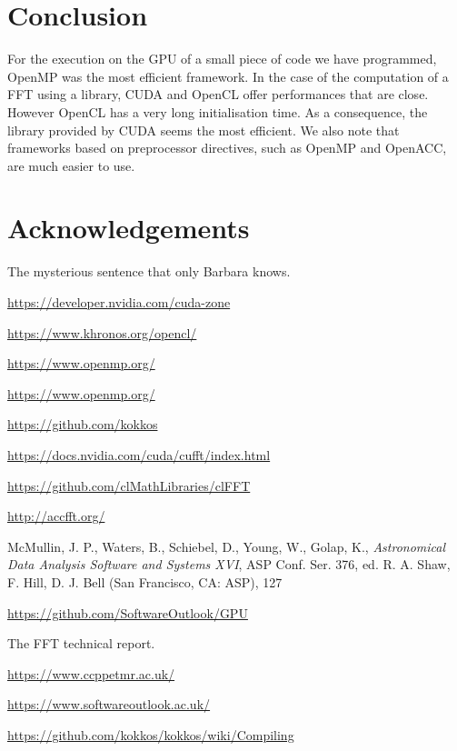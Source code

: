 \documentclass[12pt, a4paper]{article}
\begin{document}
\section{Conclusion}
For the execution on the GPU of a small piece of code we have programmed, OpenMP was the most efficient framework. In the case of the computation of a FFT using a library, CUDA and OpenCL offer performances that are close. However OpenCL has a very long initialisation time. As a consequence, the library provided by CUDA seems the most efficient. We also note that frameworks based on preprocessor directives, such as OpenMP and OpenACC, are much easier to use. 

\section{Acknowledgements}
The mysterious sentence that only Barbara knows.

\begin{thebibliography}{9}

\hyperlink{https://developer.nvidia.com/cuda-zone}{https://developer.nvidia.com/cuda-zone}

\hyperlink{https://www.khronos.org/opencl/}{https://www.khronos.org/opencl/}

\hyperlink{https://www.openmp.org/}{https://www.openmp.org/}
  
\hyperlink{https://www.openmp.org/}{https://www.openmp.org/}

\hyperlink{https://github.com/kokkos}{https://github.com/kokkos}

\hyperlink{https://docs.nvidia.com/cuda/cufft/index.html}{https://docs.nvidia.com/cuda/cufft/index.html}

  \hyperlink{https://github.com/clMathLibraries/clFFT}{https://github.com/clMathLibraries/clFFT}
  
\hyperlink{http://accfft.org/}{http://accfft.org/}

McMullin, J. P., Waters, B., Schiebel, D., Young, W., Golap, K.,
{\it Astronomical Data Analysis Software and Systems XVI},
ASP Conf. Ser. 376, ed. R. A. Shaw, F. Hill, D. J. Bell (San Francisco, CA: ASP), 127

\hyperlink{https://github.com/SoftwareOutlook/GPU}{https://github.com/SoftwareOutlook/GPU}

The FFT technical report.

\hyperlink{https://www.ccppetmr.ac.uk/}{https://www.ccppetmr.ac.uk/}

\hyperlink{https://www.softwareoutlook.ac.uk/}{https://www.softwareoutlook.ac.uk/}

\hyperlink{https://github.com/kokkos/kokkos/wiki/Compiling}{https://github.com/kokkos/kokkos/wiki/Compiling}

\end{thebibliography}
\end{document}
